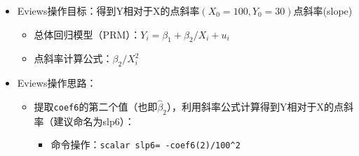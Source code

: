 \documentclass[12pt,(landscape,a4paper),(portrait,a4paper)]{article}
\providecommand{\tightlist}{%
  \setlength{\itemsep}{0pt}\setlength{\parskip}{0pt}}
\begin{document}
\begin{itemize}
\item
  Eviews操作目标：得到Y相对于X的点斜率\((X_0=100,Y_0=30)\)点斜率(slope)

  \begin{itemize}
  \item
    总体回归模型（PRM）：\(Y_i=\beta_1+\beta_2/X_i+u_i\)
  \item
    点斜率计算公式：\(\beta_2/X_i^2\)
  \end{itemize}
\item
  Eviews操作思路：

  \begin{itemize}
  \item
    提取\texttt{coef6}的第二个值（也即\(\hat{\beta}_2\)），利用斜率公式计算得到Y相对于X的点斜率（建议命名为slp6）：

    \begin{itemize}
    \tightlist
    \item
      命令操作：\texttt{scalar\ slp6=\ -coef6(2)/100\^{}2}
    \end{itemize}
  \end{itemize}
\end{itemize}
\end{document}
